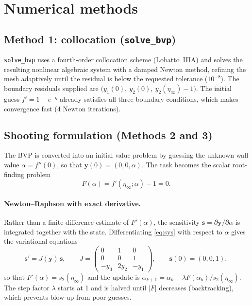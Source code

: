 \documentclass[11pt,a4paper]{article}
\begin{document}
\section{Numerical methods}

\subsection{Method 1: collocation (\texttt{solve\_bvp})}
\texttt{solve\_bvp} uses a fourth-order collocation scheme (Lobatto~IIIA) and solves the resulting
nonlinear algebraic system with a damped Newton method, refining the mesh adaptively until the
residual is below the requested tolerance ($10^{-8}$). The boundary residuals supplied are
$\big(y_1(0),\ y_2(0),\ y_2(\eta_\infty)-1\big)$. The initial guess
$f' = 1 - e^{-\eta}$ already satisfies all three boundary conditions, which makes convergence
fast (4 Newton iterations).

\subsection{Shooting formulation (Methods 2 and 3)}
The BVP is converted into an initial value problem by guessing the unknown wall value
$\alpha = f''(0)$, so that $\mathbf{y}(0) = (0,0,\alpha)$. The task becomes the scalar root-finding problem
\begin{equation}
F(\alpha) = f'(\eta_\infty;\alpha) - 1 = 0 .
\end{equation}
\paragraph{Newton--Raphson with exact derivative.}
Rather than a finite-difference estimate of $F'(\alpha)$, the sensitivity
$\mathbf{s} = \partial\mathbf{y}/\partial\alpha$ is integrated together with the state. Differentiating
\eqref{eq:sys} with respect to $\alpha$ gives the variational equations
\begin{equation}
\mathbf{s}' = J(\mathbf{y})\,\mathbf{s}, \qquad
J = \begin{pmatrix} 0 & 1 & 0\\ 0 & 0 & 1\\ -y_3 & 2y_2 & -y_1\end{pmatrix}, \qquad
\mathbf{s}(0) = (0,0,1),
\end{equation}
so that $F'(\alpha) = s_2(\eta_\infty)$ and the update is $\alpha_{k+1} = \alpha_k - \lambda F(\alpha_k)/s_2(\eta_\infty)$.
The step factor $\lambda$ starts at 1 and is halved until $|F|$ decreases (backtracking), which
prevents blow-up from poor guesses.
\end{document}
